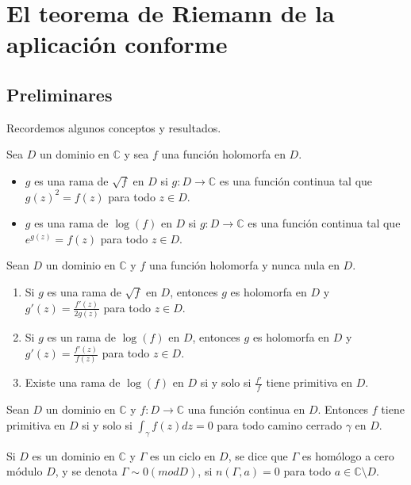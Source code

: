 \chapter{El teorema de Riemann de la aplicación conforme}

\section{Preliminares}
Recordemos algunos conceptos y resultados.

\begin{definition}
    Sea $D$ un dominio en $\mathbb{C}$ y sea $f$ una función holomorfa en $D$.
    \begin{itemize}
        \item $g$ es una rama de $\sqrt{f}$ en $D$ si $g: D \to \mathbb{C}$ es una función continua tal que $g(z)^2 = f(z)$ para todo $z \in D$.
        \item $g$ es una rama de $\log(f)$ en $D$ si $g: D \to \mathbb{C}$ es una función continua tal que $e^{g(z)} = f(z)$ para todo $z \in D$.
    \end{itemize}
\end{definition}

\begin{proposition}
    Sean $D$ un dominio en $\mathbb{C}$ y $f$ una función holomorfa y nunca nula en $D$.
    \begin{enumerate}
        \item Si $g$ es una rama de $\sqrt{f}$ en $D$, entonces $g$ es holomorfa en $D$ y $g'(z) = \frac{f'(z)}{2g(z)}$ para todo $z \in D$.
        \item Si $g$ es un rama de $\log(f)$ en $D$, entonces $g$ es holomorfa en $D$ y $g'(z) = \frac{f'(z)}{f(z)}$ para todo $z \in D$.
        \item Existe una rama de $\log(f)$ en $D$ si y solo si $\frac{f'}{f}$ tiene primitiva en $D$.
    \end{enumerate}
\end{proposition}

\begin{proposition}
    Sean $D$ un dominio en $\mathbb{C}$ y $f: D \to \mathbb{C}$ una función continua en $D$.
    Entonces $f$ tiene primitiva en $D$ si y solo si $\int_\gamma f(z)dz = 0$ para todo camino cerrado $\gamma$ en $D$.
\end{proposition}

\begin{definition}
    Si $D$ es un dominio en $\mathbb{C}$ y $\Gamma$ es un ciclo en $D$, se dice que $\Gamma$ es homólogo a cero módulo $D$, y se denota $\Gamma \sim 0 (mod D)$, si $n(\Gamma, a) = 0$ para todo $a \in \mathbb{C} \setminus D$.
\end{definition}

